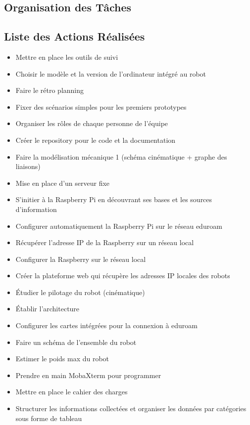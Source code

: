 \documentclass[a4paper,12pt]{report}  %
\begin{document}
\subsection{Organisation des Tâches}

\subsection{Liste des Actions Réalisées}

\begin{itemize}
	\item Mettre en place les outils de suivi
	\item Choisir le modèle et la version de l'ordinateur intégré au robot
	\item Faire le rétro planning
	\item Fixer des scénarios simples pour les premiers prototypes
	\item Organiser les rôles de chaque personne de l'équipe
	\item Créer le repository pour le code et la documentation
	\item Faire la modélisation mécanique 1 (schéma cinématique + graphe des liaisons)
	\item Mise en place d'un serveur fixe 
	\item S’initier à la Raspberry Pi en découvrant ses bases et les sources d'information
	\item Configurer automatiquement la Raspberry Pi sur le réseau eduroam 
	\item Récupérer l'adresse IP de la Raspberry sur un réseau local
	\item Configurer la Raspberry sur le réseau local
	\item Créer la plateforme web qui récupère les adresses IP locales des robots
	\item Étudier le pilotage du robot (cinématique)
	\item Établir l'architecture
	\item Configurer les cartes intégrées pour la connexion à eduroam 
	\item Faire un schéma de l'ensemble du robot 
	\item Estimer le poids max du robot 
	\item Prendre en main MobaXterm pour programmer
	\item Mettre en place le cahier des charges
	\item Structurer les informations collectées et organiser les données par catégories sous forme de tableau

\end{itemize}
\end{document}
